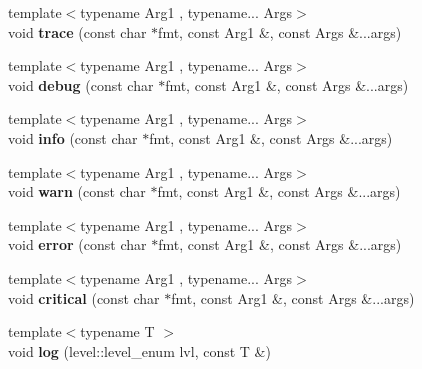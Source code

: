 \begin{DoxyCompactItemize}
\item 
{\footnotesize template$<$typename Arg1 , typename... Args$>$ }\\void {\bfseries trace} (const char $\ast$fmt, const Arg1 \&, const Args \&...args)\hypertarget{classspdlog_1_1logger_aa580734685da694da3d17d43232ec3ac}{}\label{classspdlog_1_1logger_aa580734685da694da3d17d43232ec3ac}

\item 
{\footnotesize template$<$typename Arg1 , typename... Args$>$ }\\void {\bfseries debug} (const char $\ast$fmt, const Arg1 \&, const Args \&...args)\hypertarget{classspdlog_1_1logger_af814a11eca93b3a173f3da389f5f751b}{}\label{classspdlog_1_1logger_af814a11eca93b3a173f3da389f5f751b}

\item 
{\footnotesize template$<$typename Arg1 , typename... Args$>$ }\\void {\bfseries info} (const char $\ast$fmt, const Arg1 \&, const Args \&...args)\hypertarget{classspdlog_1_1logger_abbc0dd1cd95139acebe5ed0cc003ec16}{}\label{classspdlog_1_1logger_abbc0dd1cd95139acebe5ed0cc003ec16}

\item 
{\footnotesize template$<$typename Arg1 , typename... Args$>$ }\\void {\bfseries warn} (const char $\ast$fmt, const Arg1 \&, const Args \&...args)\hypertarget{classspdlog_1_1logger_a04c38de2bcde8fa35d56f136988bf338}{}\label{classspdlog_1_1logger_a04c38de2bcde8fa35d56f136988bf338}

\item 
{\footnotesize template$<$typename Arg1 , typename... Args$>$ }\\void {\bfseries error} (const char $\ast$fmt, const Arg1 \&, const Args \&...args)\hypertarget{classspdlog_1_1logger_aadc2f59f010c7d7140e1d90900d7888e}{}\label{classspdlog_1_1logger_aadc2f59f010c7d7140e1d90900d7888e}

\item 
{\footnotesize template$<$typename Arg1 , typename... Args$>$ }\\void {\bfseries critical} (const char $\ast$fmt, const Arg1 \&, const Args \&...args)\hypertarget{classspdlog_1_1logger_a3dbacca444787282fb94bf2c79f48fef}{}\label{classspdlog_1_1logger_a3dbacca444787282fb94bf2c79f48fef}

\item 
{\footnotesize template$<$typename T $>$ }\\void {\bfseries log} (level\+::level\+\_\+enum lvl, const T \&)\hypertarget{classspdlog_1_1logger_a16d3d178ac86ea71b8a0becfca0c5449}{}\label{classspdlog_1_1logger_a16d3d178ac86ea71b8a0becfca0c5449}


\end{DoxyCompactItemize}
